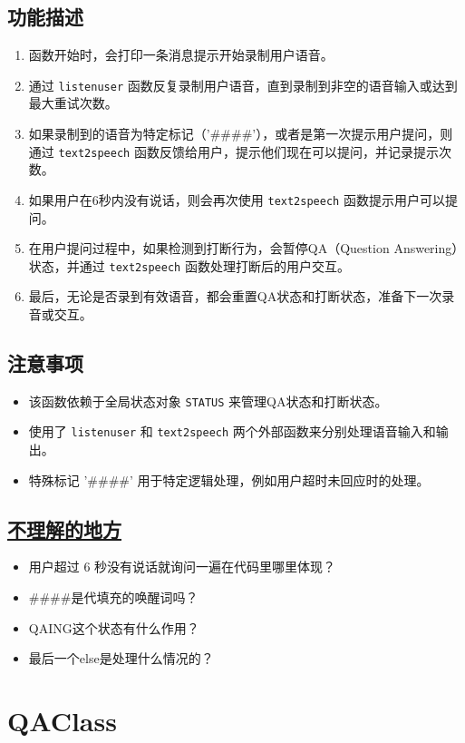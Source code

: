 \documentclass[]{article}
\begin{document}
\subsection{功能描述}
\begin{enumerate}
	\item 函数开始时，会打印一条消息提示开始录制用户语音。
	\item 通过 \texttt{listenuser} 函数反复录制用户语音，直到录制到非空的语音输入或达到最大重试次数。
	\item 如果录制到的语音为特定标记（'\#\#\#\#'），或者是第一次提示用户提问，则通过 \texttt{text2speech} 函数反馈给用户，提示他们现在可以提问，并记录提示次数。
	\item 如果用户在6秒内没有说话，则会再次使用 \texttt{text2speech} 函数提示用户可以提问。
	\item 在用户提问过程中，如果检测到打断行为，会暂停QA（Question Answering）状态，并通过 \texttt{text2speech} 函数处理打断后的用户交互。
	\item 最后，无论是否录到有效语音，都会重置QA状态和打断状态，准备下一次录音或交互。
\end{enumerate}

\subsection{注意事项}
\begin{itemize}
	\item 该函数依赖于全局状态对象 \texttt{STATUS} 来管理QA状态和打断状态。
	\item 使用了 \texttt{listenuser} 和 \texttt{text2speech} 两个外部函数来分别处理语音输入和输出。
	\item 特殊标记 '\#\#\#\#' 用于特定逻辑处理，例如用户超时未回应时的处理。
\end{itemize}
\subsection{\underline{不理解的地方}}
\begin{itemize}
	\item 用户超过 6 秒没有说话就询问一遍在代码里哪里体现？
	\item \#\#\#\#是代填充的唤醒词吗？
	\item QAING这个状态有什么作用？
	\item 最后一个else是处理什么情况的？
\end{itemize}
	\section{QAClass}
	
\end{document}
